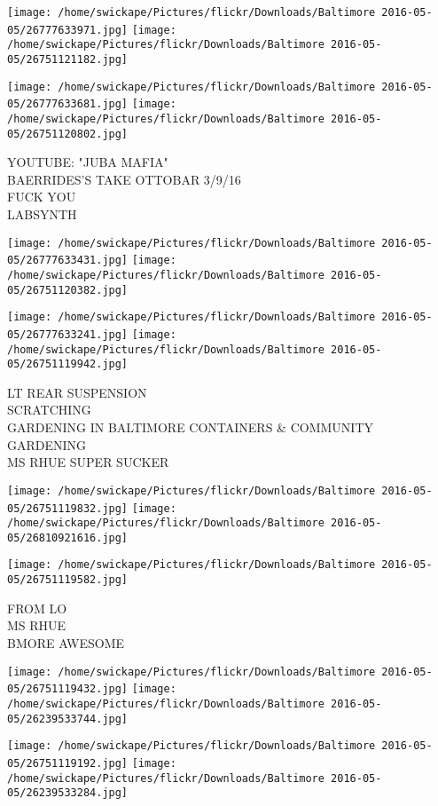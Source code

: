 \documentclass[10pt,letterpaper]{article}
\begin{document}
\texttt{[image: /home/swickape/Pictures/flickr/Downloads/Baltimore 2016-05-05/26777633971.jpg]}
\texttt{[image: /home/swickape/Pictures/flickr/Downloads/Baltimore 2016-05-05/26751121182.jpg]}

\texttt{[image: /home/swickape/Pictures/flickr/Downloads/Baltimore 2016-05-05/26777633681.jpg]}
\texttt{[image: /home/swickape/Pictures/flickr/Downloads/Baltimore 2016-05-05/26751120802.jpg]}

YOUTUBE: "JUBA MAFIA"\\
BAERRIDES'S TAKE OTTOBAR 3/9/16\\
FUCK YOU\\
LABSYNTH
\pagebreak

\texttt{[image: /home/swickape/Pictures/flickr/Downloads/Baltimore 2016-05-05/26777633431.jpg]}
\texttt{[image: /home/swickape/Pictures/flickr/Downloads/Baltimore 2016-05-05/26751120382.jpg]}

\texttt{[image: /home/swickape/Pictures/flickr/Downloads/Baltimore 2016-05-05/26777633241.jpg]}
\texttt{[image: /home/swickape/Pictures/flickr/Downloads/Baltimore 2016-05-05/26751119942.jpg]}

LT REAR SUSPENSION\\
SCRATCHING\\
GARDENING IN BALTIMORE CONTAINERS \& COMMUNITY GARDENING\\
MS RHUE SUPER SUCKER
\pagebreak

\texttt{[image: /home/swickape/Pictures/flickr/Downloads/Baltimore 2016-05-05/26751119832.jpg]}
\texttt{[image: /home/swickape/Pictures/flickr/Downloads/Baltimore 2016-05-05/26810921616.jpg]}

\vspace{0.25in}
\texttt{[image: /home/swickape/Pictures/flickr/Downloads/Baltimore 2016-05-05/26751119582.jpg]}

FROM LO\\
MS RHUE\\
BMORE AWESOME
\pagebreak

\texttt{[image: /home/swickape/Pictures/flickr/Downloads/Baltimore 2016-05-05/26751119432.jpg]}
\texttt{[image: /home/swickape/Pictures/flickr/Downloads/Baltimore 2016-05-05/26239533744.jpg]}

\texttt{[image: /home/swickape/Pictures/flickr/Downloads/Baltimore 2016-05-05/26751119192.jpg]}
\texttt{[image: /home/swickape/Pictures/flickr/Downloads/Baltimore 2016-05-05/26239533284.jpg]}
\end{document}

